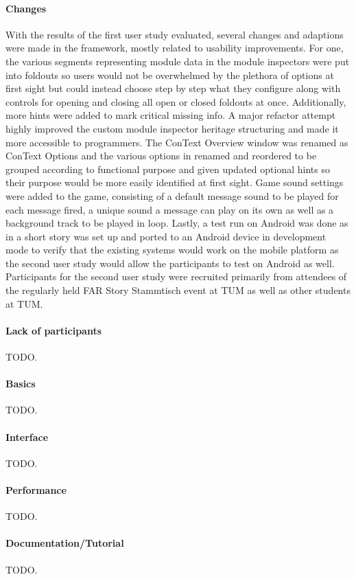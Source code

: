 \paragraph{Changes} With the results of the first user study evaluated, several changes and adaptions were made in the framework, mostly related to usability improvements. For one, the various segments representing module data in the module inspectors were put into foldouts so users would not be overwhelmed by the plethora of options at first sight but could instead choose step by step what they configure along with controls for opening and closing all open or closed foldouts at once. Additionally, more hints were added to mark critical missing info. A major refactor attempt highly improved the custom module inspector heritage structuring and made it more accessible to programmers. 
The ConText Overview window was renamed as ConText Options and the various options in renamed and reordered to be grouped according to functional purpose and given updated optional hints so their purpose would be more easily identified at first sight. 
Game sound settings were added to the game, consisting of a default message sound to be played for each message fired, a unique sound a message can play on its own as well as a background track to be played in loop. 
Lastly, a test run on Android was done as in a short story was set up and ported to an Android device in development mode to verify that the existing systems would work on the mobile platform as the second user study would allow the participants to test on Android as well. 
Participants for the second user study were recruited primarily from attendees of the regularly held FAR Story Stammtisch event at TUM as well as other students at TUM.
\paragraph{Lack of participants} TODO.
\paragraph{Basics} TODO.
\paragraph{Interface} TODO.
\paragraph{Performance} TODO.
\paragraph{Documentation/Tutorial} TODO.

